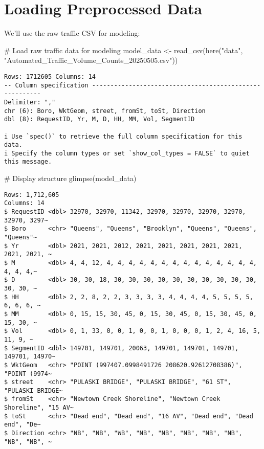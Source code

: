 \documentclass[
  letterpaper,
  DIV=11,
  numbers=noendperiod]{scrreprt}
\newenvironment{Shaded}{\begin{snugshade}}{\end{snugshade}}
\newcommand{\CommentTok}[1]{\textcolor[rgb]{0.37,0.37,0.37}{#1}}
\newcommand{\FunctionTok}[1]{\textcolor[rgb]{0.28,0.35,0.67}{#1}}
\newcommand{\NormalTok}[1]{\textcolor[rgb]{0.00,0.23,0.31}{#1}}
\newcommand{\OtherTok}[1]{\textcolor[rgb]{0.00,0.23,0.31}{#1}}
\newcommand{\StringTok}[1]{\textcolor[rgb]{0.13,0.47,0.30}{#1}}
\begin{document}
\section{Loading Preprocessed Data}\label{loading-preprocessed-data}

We'll use the raw traffic CSV for modeling:

\begin{Shaded}
\begin{Highlighting}[]
\CommentTok{\# Load raw traffic data for modeling}
\NormalTok{model\_data }\OtherTok{\textless{}{-}} \FunctionTok{read\_csv}\NormalTok{(}\FunctionTok{here}\NormalTok{(}\StringTok{"data"}\NormalTok{, }\StringTok{"Automated\_Traffic\_Volume\_Counts\_20250505.csv"}\NormalTok{))}
\end{Highlighting}
\end{Shaded}

\begin{verbatim}
Rows: 1712605 Columns: 14
-- Column specification --------------------------------------------------------
Delimiter: ","
chr (6): Boro, WktGeom, street, fromSt, toSt, Direction
dbl (8): RequestID, Yr, M, D, HH, MM, Vol, SegmentID

i Use `spec()` to retrieve the full column specification for this data.
i Specify the column types or set `show_col_types = FALSE` to quiet this message.
\end{verbatim}

\begin{Shaded}
\begin{Highlighting}[]
\CommentTok{\# Display structure}
\FunctionTok{glimpse}\NormalTok{(model\_data)}
\end{Highlighting}
\end{Shaded}

\begin{verbatim}
Rows: 1,712,605
Columns: 14
$ RequestID <dbl> 32970, 32970, 11342, 32970, 32970, 32970, 32970, 32970, 3297~
$ Boro      <chr> "Queens", "Queens", "Brooklyn", "Queens", "Queens", "Queens"~
$ Yr        <dbl> 2021, 2021, 2012, 2021, 2021, 2021, 2021, 2021, 2021, 2021, ~
$ M         <dbl> 4, 4, 12, 4, 4, 4, 4, 4, 4, 4, 4, 4, 4, 4, 4, 4, 4, 4, 4, 4,~
$ D         <dbl> 30, 30, 18, 30, 30, 30, 30, 30, 30, 30, 30, 30, 30, 30, 30, ~
$ HH        <dbl> 2, 2, 8, 2, 2, 3, 3, 3, 3, 4, 4, 4, 4, 5, 5, 5, 5, 6, 6, 6, ~
$ MM        <dbl> 0, 15, 15, 30, 45, 0, 15, 30, 45, 0, 15, 30, 45, 0, 15, 30, ~
$ Vol       <dbl> 0, 1, 33, 0, 0, 1, 0, 0, 1, 0, 0, 0, 1, 2, 4, 16, 5, 11, 9, ~
$ SegmentID <dbl> 149701, 149701, 20063, 149701, 149701, 149701, 149701, 14970~
$ WktGeom   <chr> "POINT (997407.0998491726 208620.92612708386)", "POINT (9974~
$ street    <chr> "PULASKI BRIDGE", "PULASKI BRIDGE", "61 ST", "PULASKI BRIDGE~
$ fromSt    <chr> "Newtown Creek Shoreline", "Newtown Creek Shoreline", "15 AV~
$ toSt      <chr> "Dead end", "Dead end", "16 AV", "Dead end", "Dead end", "De~
$ Direction <chr> "NB", "NB", "WB", "NB", "NB", "NB", "NB", "NB", "NB", "NB", ~
\end{verbatim}
\end{document}
